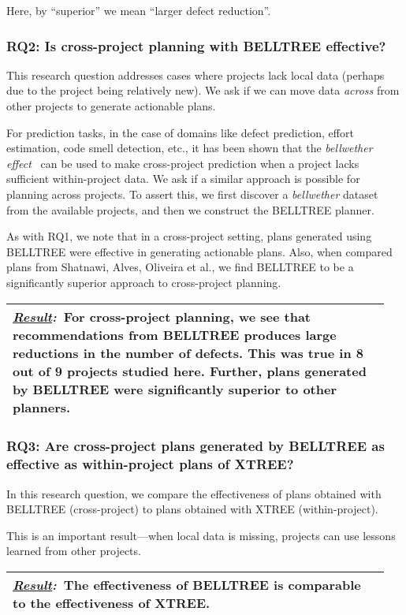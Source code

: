 \documentclass[smallextended]{svjour3}       %
\newcommand{\result}[1]{
\vspace{0.2cm}
\noindent\begin{minipage}{\linewidth}
\begin{tabular}{|p{0.95\linewidth}|}
\hline\vspace{-0.2cm}
\textbf{\textit{\underline{Result}:}}~#1\\\hline
\end{tabular}
\end{minipage}\bigstrut
}
\begin{document}
\vspace{2mm}
\noindent Here, by ``superior'' we mean ``larger defect reduction''.

\subsubsection*{RQ2: Is cross-project planning with BELLTREE effective?}
  
This research question addresses cases where projects lack local data (perhaps due to the project being relatively new). We ask if we can move data {\em across}
from other projects to generate actionable plans.

For prediction tasks, in the case of domains like defect prediction, effort estimation, code smell detection, etc., it has been shown that the \textit{bellwether effect}~\cite{krishna17a} can be used to make cross-project prediction when a project lacks sufficient within-project data. We ask if a similar approach is possible for planning across projects. To assert this, we first discover a \textit{bellwether} dataset from the available projects, and then we construct the BELLTREE planner. 

As with RQ1, we note that in a cross-project setting, plans generated using BELLTREE were  effective in generating actionable plans. Also, when compared plans from
Shatnawi, Alves, Oliveira et al., we find BELLTREE to be a significantly superior approach to cross-project planning.

\result{For cross-project planning, we see that recommendations from BELLTREE produces large reductions in the number of defects. This was true in 8 out of 9 projects studied here. Further, plans generated by BELLTREE were significantly superior to other planners.}


\subsubsection*{RQ3: Are cross-project plans generated by BELLTREE as effective as within-project plans of XTREE?}

In this research question, we compare the effectiveness of plans obtained with BELLTREE (cross-project) to plans obtained with XTREE (within-project). 

This is an important result---when local data is missing,  projects can use lessons learned from other projects.

\result{The effectiveness of BELLTREE is comparable to the effectiveness of XTREE.}
\end{document}
